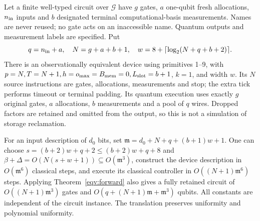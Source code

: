 \begin{theorem}\label{eqv:reverse}
Let a finite well-typed circuit over $\mathcal G$ have $g$ gates,
$a$ one-qubit fresh allocations, $n_{\rm in}$ inputs and $b$ designated
terminal computational-basis measurements. Names are never reused;
no gate acts on an inaccessible name. Quantum outputs and measurement
labels are specified. Put
\[
 q=n_{\rm in}+a,\quad N=g+a+b+1,\quad
 w=8+\lceil\log_2(N+q+b+2)\rceil.
\]
There is an observationally equivalent device using primitives 1--9,
with $p=N,T=N+1,h=o_{\max}=B_{\rm mem}=0,L_{\rm slot}=b+1$,
$k=1$, and width $w$. Its $N$ source
instructions are gates, allocations, measurements and stop; the extra
tick performs timeout or terminal padding. Its quantum execution uses
exactly $g$ original gates, $a$ allocations, $b$ measurements and a
pool of $q$ wires. Dropped factors are retained and omitted from the
output, so this is not a simulation of storage reclamation.

For an input description of $d_0$ bits, set
${\mathfrak m}=d_0+N+q+(b+1)w+1$. One can choose
$s=(b+2)w+q+2\leq(b+2)w+q+8$ and
$\beta+\Delta=O(N(s+w+1))\subseteq O({\mathfrak m}^3)$,
construct the device description in $O({\mathfrak m}^6)$
classical steps, and execute its classical controller in
$O((N+1){\mathfrak m}^6)$ steps. Applying Theorem~\ref{eqv:forward} also gives a
fully retained circuit of $O((N+1){\mathfrak m}^3)$ gates and
$O(q+(N+1){\mathfrak m}+{\mathfrak m}^3)$ qubits. All constants are independent of the
circuit instance. The translation preserves uniformity and polynomial
uniformity.
\end{theorem}
